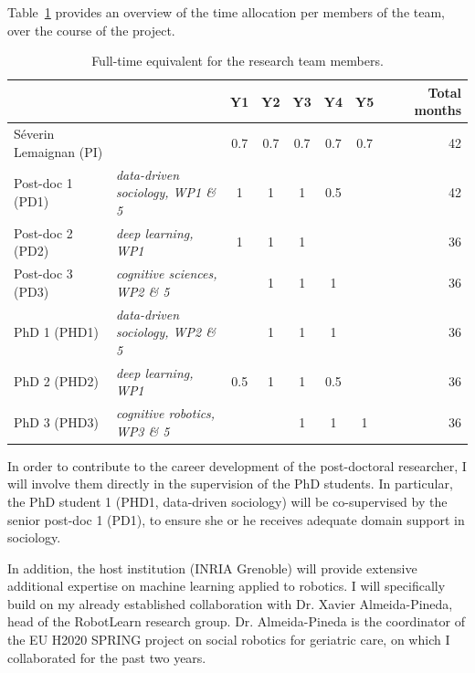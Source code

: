 Table~\ref{time-allocation-team} provides an overview of the time allocation per
members of the team, over the course of the project.

\begin{table}[h!]
    \centering
\begin{tabular}{@{}llccccccr@{}}
\toprule
    \textit{\textbf{}}     &       & \textbf{Y1} & \textbf{Y2} & \textbf{Y3} & \textbf{Y4} & \textbf{Y5} &  & \textbf{Total months} \\ \midrule
    Séverin Lemaignan (PI) &                                           & 0.7  & 0.7  & 0.7  & 0.7 & 0.7  &  & 42                    \\ \midrule
    Post-doc 1 (PD1)       & \textit{data-driven sociology, WP1 \& 5}  & 1    & 1    & 1    & 0.5 &      &  & 42                    \\
    Post-doc 2 (PD2)       & \textit{deep learning, WP1}               & 1    & 1    & 1    &     &      &  & 36                    \\
    Post-doc 3 (PD3)       & \textit{cognitive sciences, WP2 \& 5}     &      & 1    & 1    & 1   &      &  & 36                    \\ \midrule
    PhD 1 (PHD1)           & \textit{data-driven sociology, WP2 \& 5}  &      & 1    & 1    & 1   &      &  & 36                    \\
    PhD 2 (PHD2)           & \textit{deep learning, WP1}               & 0.5  & 1    & 1    & 0.5 &      &  & 36                    \\ 
    PhD 3 (PHD3)           & \textit{cognitive robotics, WP3 \& 5}     &      &      & 1    & 1   & 1    &  & 36                    \\ \bottomrule
\end{tabular}
    \caption{Full-time equivalent for the research team members.}
    \label{time-allocation-team}
\end{table}

In order to contribute to the career development of the post-doctoral
researcher, I will involve them directly in the supervision of the PhD
students. In particular, the PhD student 1 (PHD1, data-driven sociology) will
be co-supervised by the senior post-doc 1 (PD1), to ensure she or he receives
adequate domain support in sociology.

In addition, the host institution (INRIA Grenoble) will provide extensive
additional expertise on machine learning applied to robotics. I will specifically build on
my already established collaboration with Dr. Xavier Almeida-Pineda, head of the
RobotLearn research group. Dr. Almeida-Pineda is the coordinator of the EU H2020
SPRING project on social robotics for geriatric care, on which I collaborated
for the past two years.

